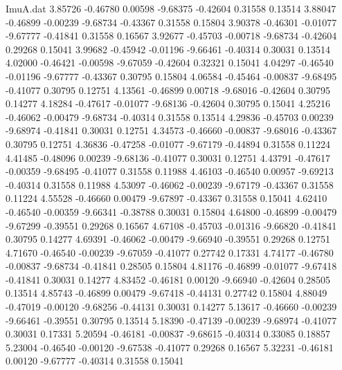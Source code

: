 \begin{filecontents}{ImuA.dat}
   3.85726   -0.46780    0.00598   -9.68375   -0.42604    0.31558    0.13514
   3.88047   -0.46899   -0.00239   -9.68734   -0.43367    0.31558    0.15804
   3.90378   -0.46301   -0.01077   -9.67777   -0.41841    0.31558    0.16567
   3.92677   -0.45703   -0.00718   -9.68734   -0.42604    0.29268    0.15041
   3.99682   -0.45942   -0.01196   -9.66461   -0.40314    0.30031    0.13514
   4.02000   -0.46421   -0.00598   -9.67059   -0.42604    0.32321    0.15041
   4.04297   -0.46540   -0.01196   -9.67777   -0.43367    0.30795    0.15804
   4.06584   -0.45464   -0.00837   -9.68495   -0.41077    0.30795    0.12751
   4.13561   -0.46899    0.00718   -9.68016   -0.42604    0.30795    0.14277
   4.18284   -0.47617   -0.01077   -9.68136   -0.42604    0.30795    0.15041
   4.25216   -0.46062   -0.00479   -9.68734   -0.40314    0.31558    0.13514
   4.29836   -0.45703    0.00239   -9.68974   -0.41841    0.30031    0.12751
   4.34573   -0.46660   -0.00837   -9.68016   -0.43367    0.30795    0.12751
   4.36836   -0.47258   -0.01077   -9.67179   -0.44894    0.31558    0.11224
   4.41485   -0.48096    0.00239   -9.68136   -0.41077    0.30031    0.12751
   4.43791   -0.47617   -0.00359   -9.68495   -0.41077    0.31558    0.11988
   4.46103   -0.46540    0.00957   -9.69213   -0.40314    0.31558    0.11988
   4.53097   -0.46062   -0.00239   -9.67179   -0.43367    0.31558    0.11224
   4.55528   -0.46660    0.00479   -9.67897   -0.43367    0.31558    0.15041
   4.62410   -0.46540   -0.00359   -9.66341   -0.38788    0.30031    0.15804
   4.64800   -0.46899   -0.00479   -9.67299   -0.39551    0.29268    0.16567
   4.67108   -0.45703   -0.01316   -9.66820   -0.41841    0.30795    0.14277
   4.69391   -0.46062   -0.00479   -9.66940   -0.39551    0.29268    0.12751
   4.71670   -0.46540   -0.00239   -9.67059   -0.41077    0.27742    0.17331
   4.74177   -0.46780   -0.00837   -9.68734   -0.41841    0.28505    0.15804
   4.81176   -0.46899   -0.01077   -9.67418   -0.41841    0.30031    0.14277
   4.83452   -0.46181    0.00120   -9.66940   -0.42604    0.28505    0.13514
   4.85743   -0.46899    0.00479   -9.67418   -0.44131    0.27742    0.15804
   4.88049   -0.47019   -0.00120   -9.68256   -0.44131    0.30031    0.14277
   5.13617   -0.46660   -0.00239   -9.66461   -0.39551    0.30795    0.13514
   5.18390   -0.47139   -0.00239   -9.68974   -0.41077    0.30031    0.17331
   5.20594   -0.46181   -0.00837   -9.68615   -0.40314    0.33085    0.18857
   5.23004   -0.46540   -0.00120   -9.67538   -0.41077    0.29268    0.16567
   5.32231   -0.46181    0.00120   -9.67777   -0.40314    0.31558    0.15041

\end{filecontents}
